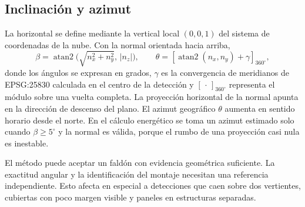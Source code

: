 \subsection{Inclinación y azimut}

La horizontal se define mediante la vertical local \((0,0,1)\) del sistema de coordenadas de la nube. Con la normal orientada hacia arriba,
\[
\beta=\operatorname{atan2}\!\bigl(\sqrt{n_x^2+n_y^2},\,|n_z|\bigr),
\qquad
\theta=\left[\operatorname{atan2}(n_x,n_y)+\gamma\right]_{360^\circ},
\]
donde los ángulos se expresan en grados, \(\gamma\) es la convergencia de meridianos de EPSG:25830 calculada en el centro de la detección y \([\,\cdot\,]_{360^\circ}\) representa el módulo sobre una vuelta completa. La proyección horizontal de la normal apunta en la dirección de descenso del plano. El azimut geográfico \(\theta\) aumenta en sentido horario desde el norte. En el cálculo energético se toma un azimut estimado solo cuando \(\beta\geq5^\circ\) y la normal es válida, porque el rumbo de una proyección casi nula es inestable.

El método puede aceptar un faldón con evidencia geométrica suficiente. La exactitud angular y la identificación del montaje necesitan una referencia independiente. Esto afecta en especial a detecciones que caen sobre dos vertientes, cubiertas con poco margen visible y paneles en estructuras separadas.
